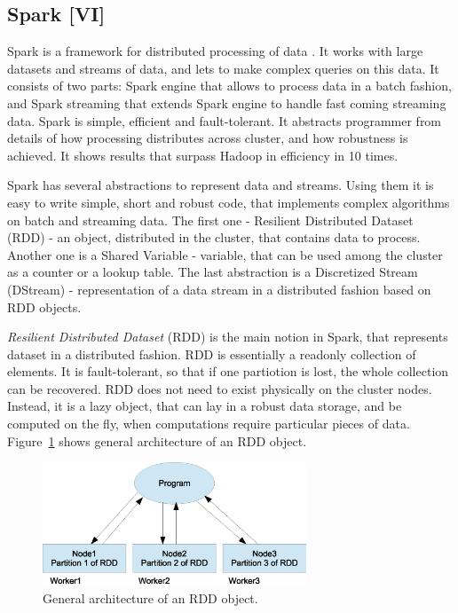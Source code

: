\subsection{Spark [VI]}

Spark is a framework for distributed processing of data \cite{Zaharia2010} \cite{Zaharia2013} \cite{Spark1} \cite{Spark2}.
It works with large datasets and streams of data, and lets to make complex queries on this data.
It consists of two parts: Spark engine that allows to process data in a batch fashion, and Spark streaming that extends Spark engine to handle fast coming streaming data.
Spark is simple, efficient and fault-tolerant.
It abstracts programmer from details of how processing distributes across cluster, and how robustness is achieved.
It shows results that surpass Hadoop in efficiency in 10 times.

Spark has several abstractions to represent data and streams.
Using them it is easy to write simple, short and robust code, that implements complex algorithms on batch and streaming data.
The first one - Resilient Distributed Dataset (RDD) - an object, distributed in the cluster, that contains data to process.
Another one is a Shared Variable - variable, that can be used among the cluster as a counter or a lookup table.
The last abstraction is a Discretized Stream (DStream) - representation of a data stream in a distributed fashion based on RDD objects.


\textit{Resilient Distributed Dataset}  (RDD) is the main notion in Spark, that represents dataset in a distributed fashion.
RDD is essentially a readonly collection of elements.
It is fault-tolerant, so that if one partiotion is lost, the whole collection can be recovered.
RDD does not need to exist physically on the cluster nodes.
Instead, it is a lazy object, that can lay in a robust data storage, and be computed on the fly, when computations require particular pieces of data.
Figure~\ref{fig:RDDArchitecture} shows general architecture of an RDD object.

\begin{figure}[h]
  \centering
  \includegraphics [width=0.7\textwidth]{images/RDDArchitecture}
  \caption{General architecture of an RDD object.}
  \label{fig:RDDArchitecture}
\end{figure}

